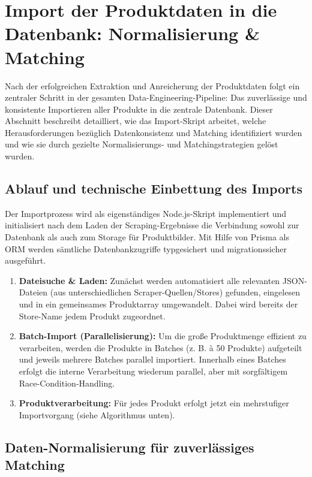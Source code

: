 \documentclass[12pt, a4paper]{report} %
\begin{document}
\section{Import der Produktdaten in die Datenbank: Normalisierung \& Matching}

Nach der erfolgreichen Extraktion und Anreicherung der Produktdaten folgt ein zentraler Schritt in der gesamten Data-Engineering-Pipeline: Das zuverlässige und konsistente Importieren aller Produkte in die zentrale Datenbank. Dieser Abschnitt beschreibt detailliert, wie das Import-Skript arbeitet, welche Herausforderungen bezüglich Datenkonsistenz und Matching identifiziert wurden und wie sie durch gezielte Normalisierungs- und Matchingstrategien gelöst wurden.

\subsection{Ablauf und technische Einbettung des Imports}

Der Importprozess wird als eigenständiges Node.js-Skript implementiert und initialisiert nach dem Laden der Scraping-Ergebnisse die Verbindung sowohl zur Datenbank als auch zum Storage für Produktbilder. Mit Hilfe von Prisma als ORM werden sämtliche Datenbankzugriffe typgesichert und migrationssicher ausgeführt.

\begin{enumerate}
    \item \textbf{Dateisuche \& Laden:} Zunächst werden automatisiert alle relevanten JSON-Dateien (aus unterschiedlichen Scraper-Quellen/Stores) gefunden, eingelesen und in ein gemeinsames Produktarray umgewandelt. Dabei wird bereits der Store-Name jedem Produkt zugeordnet.
    \item \textbf{Batch-Import (Parallelisierung):} Um die große Produktmenge effizient zu verarbeiten, werden die Produkte in Batches (z. B. à 50 Produkte) aufgeteilt und jeweils mehrere Batches parallel importiert. Innerhalb eines Batches erfolgt die interne Verarbeitung wiederum parallel, aber mit sorgfältigem Race-Condition-Handling.
    \item \textbf{Produktverarbeitung:} Für jedes Produkt erfolgt jetzt ein mehrstufiger Importvorgang (siehe Algorithmus unten).
\end{enumerate}

\subsection{Daten-Normalisierung für zuverlässiges Matching}
\end{document}
